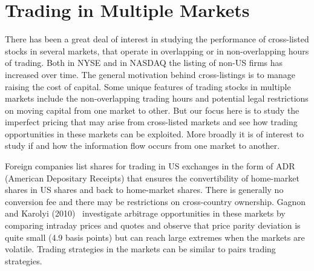 \section{Trading in Multiple Markets} \label{in:multmark}

There has been a great deal of interest in studying the performance of cross-listed stocks in several markets, that operate in overlapping or in non-overlapping hours of trading. Both in NYSE and in NASDAQ the listing of non-US firms has increased over time. The general motivation behind cross-listings is to manage raising the cost of capital. Some unique features of trading stocks in multiple markets include the non-overlapping trading hours and potential legal restrictions on moving capital from one market to other. But our focus here is to study the imperfect pricing that may arise from cross-listed markets and see how trading opportunities in these markets can be exploited. More broadly it is of interest to study if and how the information flow occurs from one market to another.


Foreign companies list shares for trading in US exchanges in the form of ADR (American Depositary Receipts) that ensures the convertibility of home-market shares in US shares and back to home-market shares. There is generally no conversion fee and there may be restrictions on cross-country ownership. Gagnon and Karolyi (2010)~\cite{gagkar} investigate arbitrage opportunities in these markets by comparing intraday prices and quotes and observe that price parity deviation is quite small (4.9 basis points) but can reach large extremes when the markets are volatile. Trading strategies in the markets can be similar to pairs trading strategies. 


